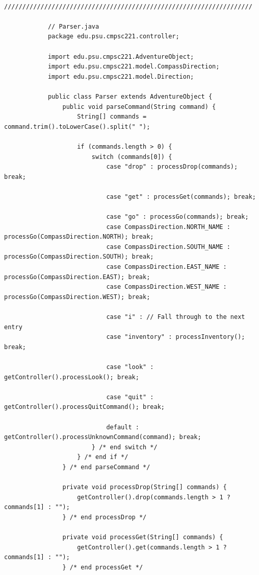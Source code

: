 \documentclass[a4paper, 11pt]{article}
\begin{document}
\begin{lstlisting}
            ////////////////////////////////////////////////////////////////////

            // Parser.java
            package edu.psu.cmpsc221.controller;

            import edu.psu.cmpsc221.AdventureObject;
            import edu.psu.cmpsc221.model.CompassDirection;
            import edu.psu.cmpsc221.model.Direction;

            public class Parser extends AdventureObject {
                public void parseCommand(String command) {
                    String[] commands = command.trim().toLowerCase().split(" ");

                    if (commands.length > 0) {
                        switch (commands[0]) {
                            case "drop" : processDrop(commands); break;

                            case "get" : processGet(commands); break;

                            case "go" : processGo(commands); break;
                            case CompassDirection.NORTH_NAME : processGo(CompassDirection.NORTH); break;
                            case CompassDirection.SOUTH_NAME : processGo(CompassDirection.SOUTH); break;
                            case CompassDirection.EAST_NAME : processGo(CompassDirection.EAST); break;
                            case CompassDirection.WEST_NAME : processGo(CompassDirection.WEST); break;

                            case "i" : // Fall through to the next entry
                            case "inventory" : processInventory(); break;

                            case "look" : getController().processLook(); break;

                            case "quit" : getController().processQuitCommand(); break;

                            default : getController().processUnknownCommand(command); break;
                        } /* end switch */
                    } /* end if */
                } /* end parseCommand */

                private void processDrop(String[] commands) {
                    getController().drop(commands.length > 1 ? commands[1] : "");
                } /* end processDrop */

                private void processGet(String[] commands) {
                    getController().get(commands.length > 1 ? commands[1] : "");
                } /* end processGet */


\end{lstlisting}
\end{document}
